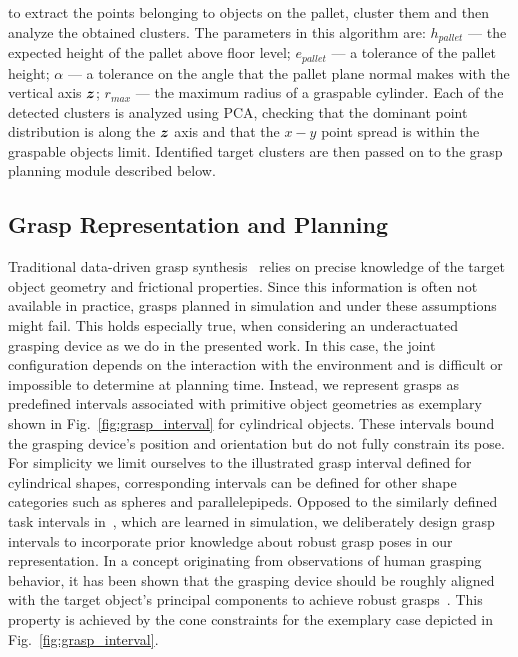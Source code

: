 to extract the points belonging to objects on the pallet, cluster them and then analyze the obtained
clusters. The parameters in this algorithm are: $h_{pallet}$ --- the expected height of the pallet
above floor level; $e_{pallet}$ --- a tolerance of the pallet height; $\alpha$ --- a tolerance on
the angle that the pallet plane normal makes with the vertical axis $\mbox{\boldmath $z$}$; $r_{max}$ --- the
maximum radius of a graspable cylinder. Each of the detected clusters is analyzed using PCA,
checking that the dominant point distribution is along the $\mbox{\boldmath $z$}$ axis and that the $x-y$ point
spread is within the graspable objects limit. Identified target clusters are then passed on to the
grasp planning module described below.
%
\subsection{Grasp Representation and Planning}
\label{subsec:grasp_planning}
%
Traditional data-driven grasp synthesis~\cite{Bohg14} relies on precise knowledge of the target
object geometry and frictional properties. Since this information is often not available in
practice, grasps planned in simulation and under these assumptions might fail. This holds especially
true, when considering an underactuated grasping device as we do in the presented work. In this
case, the joint configuration depends on the interaction with the environment and is difficult or
impossible to determine at planning time. Instead, we represent grasps as predefined intervals
associated with primitive object geometries as exemplary shown in Fig.~\ref{fig:grasp_interval} for
cylindrical objects. These intervals bound the grasping device's position and orientation but do not
fully constrain its pose. For simplicity we limit ourselves to the illustrated grasp interval
defined for cylindrical shapes, corresponding intervals can be defined for other shape categories
such as spheres and parallelepipeds. Opposed to the similarly defined task intervals
in~\cite{Gien08a, Gien08b}, which are learned in simulation, we deliberately design grasp intervals
to incorporate prior knowledge about robust grasp poses in our representation. In a concept
originating from observations of human grasping behavior, it has been shown that the grasping device
should be roughly aligned with the target object's principal components to achieve robust
grasps~\cite{Bala12}. This property is achieved by the cone constraints for the exemplary case
depicted in Fig.~\ref{fig:grasp_interval}.

